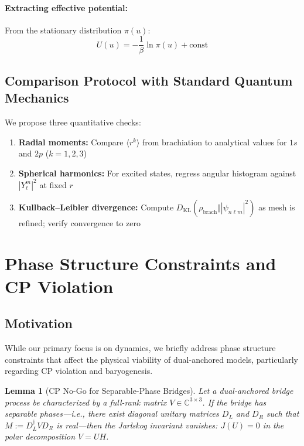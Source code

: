 \documentclass[11pt]{article}
\theoremstyle{plain}
\newtheorem{lemma}[theorem]{Lemma}
\theoremstyle{definition}
\begin{document}
\paragraph{Extracting effective potential:}
From the stationary distribution $\pi(u)$:
\begin{equation}
  U(u) = -\frac{1}{\beta}\ln\pi(u) + \text{const}
\end{equation}

\subsection{Comparison Protocol with Standard Quantum Mechanics}

We propose three quantitative checks:
\begin{enumerate}
  \item \textbf{Radial moments:} Compare $\langle r^k\rangle$ from brachiation to analytical values for $1s$ and $2p$ ($k=1,2,3$)
  \item \textbf{Spherical harmonics:} For excited states, regress angular histogram against $|Y_\ell^m|^2$ at fixed $r$
  \item \textbf{Kullback–Leibler divergence:} Compute $D_{\mathrm{KL}}(\rho_{\text{brach}}\Vert |\psi_{n\ell m}|^2)$ as mesh is refined; verify convergence to zero
\end{enumerate}

\section{Phase Structure Constraints and CP Violation}
\label{sec:cp-violation}

\subsection{Motivation}

While our primary focus is on dynamics, we briefly address phase structure constraints that affect the physical viability of dual-anchored models, particularly regarding CP violation and baryogenesis.

\begin{lemma}[CP No-Go for Separable-Phase Bridges]\label{lem:cp-nogo}
  Let a dual-anchored bridge process be characterized by a full-rank matrix $V \in \mathbb{C}^{3\times 3}$. If the bridge has separable phases—i.e., there exist diagonal unitary matrices $D_L$ and $D_R$ such that $M:=D_L^\dagger V D_R$ is real—then the Jarlskog invariant vanishes: $J(U)=0$ in the polar decomposition $V=UH$.
\end{lemma}
\end{document}

